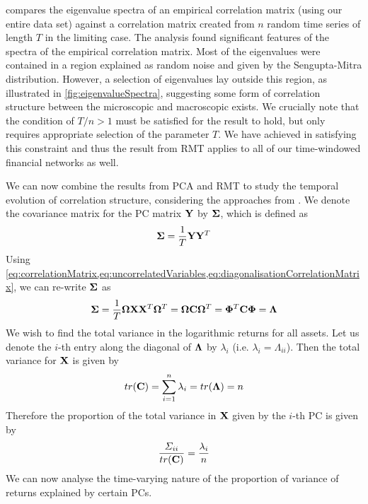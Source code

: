  compares the eigenvalue spectra of an empirical correlation matrix (using our entire data set) against a correlation matrix created from $n$ random time series of length $T$ in the limiting case.
The analysis found significant features of the spectra of the empirical correlation matrix.
Most of the eigenvalues were contained in a region explained as random noise and given by the Sengupta-Mitra distribution.
However, a selection of eigenvalues lay outside this region, as illustrated in \cref{fig:eigenvalueSpectra}, suggesting some form of correlation structure between the microscopic and macroscopic exists.
We crucially note that the condition of $T/n > 1$ must be satisfied for the result to hold, but only requires appropriate selection of the parameter $T$.
We have achieved in satisfying this constraint and thus the result from RMT applies to all of our time-windowed financial networks as well.

We can now combine the results from PCA and RMT to study the temporal evolution of correlation structure, considering the approaches from \cite{UIO03,FPM+10,FPW+11}.
We denote the covariance matrix for the PC matrix $\mathbf Y$ by $\mathbf\Sigma$, which is defined as
\begin{equation}
	\label{eq:PCCovarainceMatrix}
	\mathbf\Sigma = \frac{1}{T} \mathbf Y \mathbf Y^{T}
\end{equation}
Using \cref{eq:correlationMatrix,eq:uncorrelatedVariables,eq:diagonalisationCorrelationMatrix}, we can re-write $\mathbf\Sigma$ as
\begin{equation}
	\label{eq:PCCovarainceMatrixRewritten}
	\mathbf\Sigma = \frac{1}{T} \mathbf\Omega \mathbf X \mathbf X^{T} \mathbf\Omega^{T} = \mathbf\Omega \mathbf C \mathbf\Omega^{T} = \mathbf\Phi^{T} \mathbf C \mathbf\Phi = \mathbf\Lambda
\end{equation}
We wish to find the total variance in the logarithmic returns for all assets.
Let us denote the $i$-th entry along the diagonal of $\mathbf\Lambda$ by $\lambda_{i}$ (i.e. $\lambda_{i} = \Lambda_{ii}$).
Then the total variance for $\mathbf X$ is given by
\begin{equation}
	\label{eq:totalVarianceLogarithmicReturns}
	tr(\mathbf C) = \sum_{i=1}^{n} \lambda_{i} = tr(\mathbf\Lambda) = n
\end{equation}
Therefore the proportion of the total variance in $\mathbf X$ given by the $i$-th PC is given by
\begin{equation}
	\label{eq:proportionVarianceLogarithmicReturns}
	\frac{\Sigma_{ii}}{tr(\mathbf C)} = \frac{\lambda_{i}}{n}
\end{equation}
We can now analyse the time-varying nature of the proportion of variance of returns explained by certain PCs.

